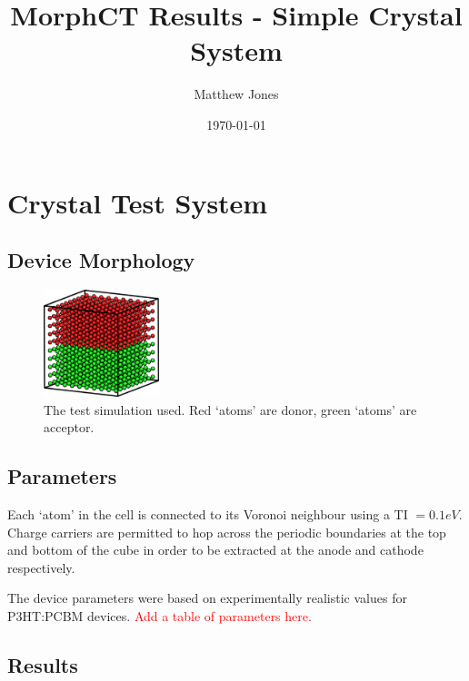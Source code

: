 \documentclass[12pt]{article}
\title{MorphCT Results - Simple Crystal System}
\author{Matthew Jones}
\date{\today}
\begin{document}
\maketitle


\section{Crystal Test System}


\subsection{Device Morphology}

\begin{figure}[h!]\centering
	\includegraphics[width=0.3\textwidth]{Figures/device.png}
    \caption{The test simulation used. Red `atoms' are donor, green `atoms' are acceptor.}
	\label{fig:device}
\end{figure}



\subsection{Parameters}

Each `atom' in the cell is connected to its Voronoi neighbour using a TI $= 0.1 eV$.
Charge carriers are permitted to hop across the periodic boundaries at the top and bottom of the cube in order to be extracted at the anode and cathode respectively.

The device parameters were based on experimentally realistic values for P3HT:PCBM devices.
\textcolor{red}{Add a table of parameters here.}


\subsection{Results}
\end{document}
